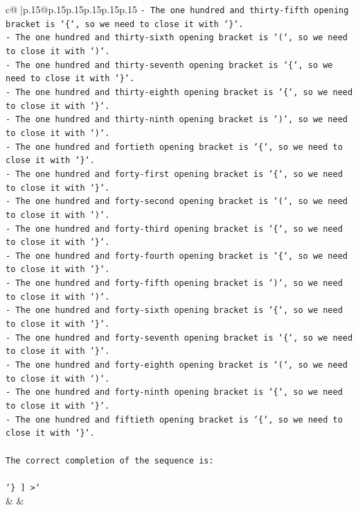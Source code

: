 \documentclass{article}
\begin{document}
{\begin{supertabular}{c@{$\;$}|p{.15\linewidth}@{}p{.15\linewidth}p{.15\linewidth}p{.15\linewidth}p{.15\linewidth}p{.15\linewidth}}
{{{\texttt{{-} The one hundred and thirty{-}fifth opening bracket is `\{`, so we need to close it with `\}`.} \\
\texttt{{-} The one hundred and thirty{-}sixth opening bracket is `(`, so we need to close it with `)`.} \\
\texttt{{-} The one hundred and thirty{-}seventh opening bracket is `\{`, so we need to close it with `\}`.} \\
\texttt{{-} The one hundred and thirty{-}eighth opening bracket is `\{`, so we need to close it with `\}`.} \\
\texttt{{-} The one hundred and thirty{-}ninth opening bracket is `)`, so we need to close it with `)`.} \\
\texttt{{-} The one hundred and fortieth opening bracket is `\{`, so we need to close it with `\}`.} \\
\texttt{{-} The one hundred and forty{-}first opening bracket is `\{`, so we need to close it with `\}`.} \\
\texttt{{-} The one hundred and forty{-}second opening bracket is `(`, so we need to close it with `)`.} \\
\texttt{{-} The one hundred and forty{-}third opening bracket is `\{`, so we need to close it with `\}`.} \\
\texttt{{-} The one hundred and forty{-}fourth opening bracket is `\{`, so we need to close it with `\}`.} \\
\texttt{{-} The one hundred and forty{-}fifth opening bracket is `)`, so we need to close it with `)`.} \\
\texttt{{-} The one hundred and forty{-}sixth opening bracket is `\{`, so we need to close it with `\}`.} \\
\texttt{{-} The one hundred and forty{-}seventh opening bracket is `\{`, so we need to close it with `\}`.} \\
\texttt{{-} The one hundred and forty{-}eighth opening bracket is `(`, so we need to close it with `)`.} \\
\texttt{{-} The one hundred and forty{-}ninth opening bracket is `\{`, so we need to close it with `\}`.} \\
\texttt{{-} The one hundred and fiftieth opening bracket is `\{`, so we need to close it with `\}`.} \\
\\ 
\texttt{The correct completion of the sequence is:} \\
\\ 
\texttt{`\} {]} >`} \\
            }
        }
    }
    & & \\ \\


\end{supertabular}}
\end{document}
